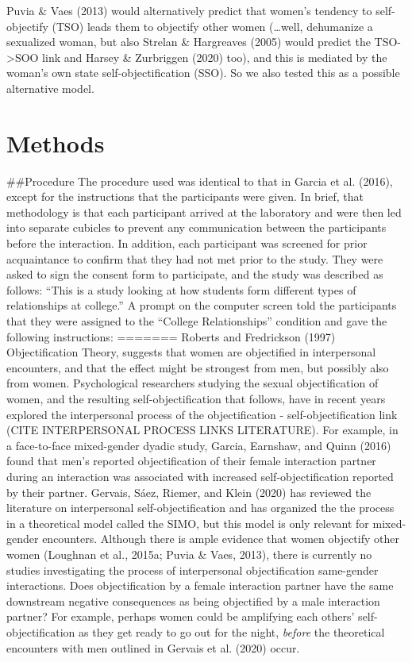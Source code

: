 \documentclass[
  man]{apa6}
\begin{document}
Puvia \& Vaes (2013) would alternatively predict that women's tendency to self-objectify (TSO) leads them to objectify other women (\ldots well, dehumanize a sexualized woman, but also Strelan \& Hargreaves (2005) would predict the TSO-\textgreater SOO link and Harsey \& Zurbriggen (2020) too), and this is mediated by the woman's own state self-objectification (SSO). So we also tested this as a possible alternative model.

\hypertarget{methods}{%
\section{Methods}\label{methods}}

\#\#Procedure
The procedure used was identical to that in Garcia et al. (2016), except for the instructions that the participants were given. In brief, that methodology is that each participant arrived at the laboratory and were then led into separate cubicles to prevent any communication between the participants before the interaction. In addition, each participant was screened for prior acquaintance to confirm that they had not met prior to the study. They were asked to sign the consent form to participate, and the study was described as follows: \enquote{This is a study looking at how students form different types of relationships at college.} A prompt on the computer screen told the participants that they were assigned to the \enquote{College Relationships} condition and gave the following instructions:
=======
Roberts and Fredrickson (1997) Objectification Theory, suggests that
women are objectified in interpersonal encounters, and that the effect
might be strongest from men, but possibly also from women. Psychological
researchers studying the sexual objectification of women, and the
resulting self-objectification that follows, have in recent years
explored the interpersonal process of the objectification -
self-objectification link (CITE INTERPERSONAL PROCESS LINKS LITERATURE).
For example, in a face-to-face mixed-gender dyadic study, Garcia,
Earnshaw, and Quinn (2016) found that men's reported objectification of
their female interaction partner during an interaction was associated
with increased self-objectification reported by their partner. Gervais,
Sáez, Riemer, and Klein (2020) has reviewed the literature on
interpersonal self-objectification and has organized the the process in
a theoretical model called the SIMO, but this model is only relevant for
mixed-gender encounters. Although there is ample evidence that women
objectify other women (Loughnan et al., 2015a; Puvia \& Vaes, 2013),
there is currently no studies investigating the process of interpersonal
objectification same-gender interactions. Does objectification by a
female interaction partner have the same downstream negative
consequences as being objectified by a male interaction partner? For
example, perhaps women could be amplifying each others'
self-objectification as they get ready to go out for the night,
\emph{before} the theoretical encounters with men outlined in Gervais et
al. (2020) occur.
\end{document}

